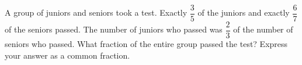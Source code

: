 A group of juniors and seniors took a test. Exactly $\dfrac{3}{5}$ of the juniors and exactly $\dfrac{6}{7}$ of the seniors passed. The number of juniors who passed was $\dfrac{2}{3}$ of the number of seniors who passed. What fraction of the entire group passed the test? Express your answer as a common fraction.

